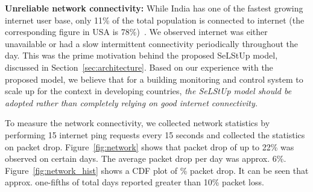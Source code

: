 \documentclass[10pt]{sensys-proc}
\newcommand{\figref}[1]{Figure~\ref{#1}}
\newcommand{\secref}[1]{Section~\ref{#1}}
\newcommand{\paradigms}{Sense-Local Store-Upload~}
\newcommand{\selstups}{SeLStUp }
\begin{document}
\noindent \textbf{Unreliable network connectivity:} While India has one of the fastest growing internet user base, only 11\% of the total population is connected to internet (the corresponding figure in USA is 78\%)~\cite{meyer}. %
We observed internet was either unavailable or had a slow intermittent connectivity periodically throughout the day. This was the prime motivation behind the proposed \selstups model, discussed in \secref{sec:architecture}. Based on our experience with the proposed model, we believe that for a building monitoring and control system to scale up for the context in developing countries, \emph{the \selstups model should be adopted rather than completely relying on good internet connectivity.} %

\noindent To measure the network connectivity, we collected network statistics by performing 15 internet ping requests every 15 seconds and collected the statistics on packet drop. \figref{fig:network} shows that packet drop of up to 22\% was observed on certain days. The average packet drop per day was approx. 6\%. \figref{fig:network_hist} shows a CDF plot of \% packet drop. It can be seen that approx. one-fifths of total days reported greater than 10\% packet loss. 
\end{document}
